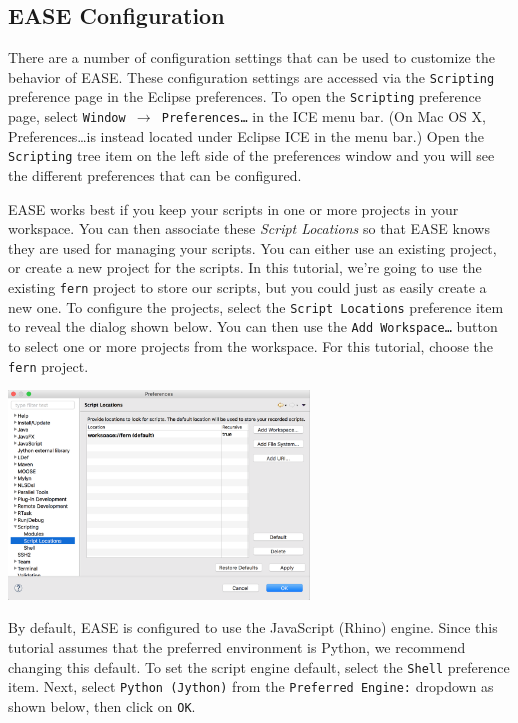 \subsection{EASE Configuration}

There are a number of configuration settings that can be used to customize the
behavior of EASE. These configuration settings are accessed via the \texttt{Scripting}
preference page in the Eclipse preferences. To open the \texttt{Scripting}
preference page, select \texttt{Window $\rightarrow$ Preferences\ldots} in the
ICE menu bar. (On Mac OS X, Preferences\ldots is instead located under Eclipse
ICE in the menu bar.) Open the \texttt{Scripting} tree item on the left side of
the preferences window and you will see the different preferences that can be
configured.

EASE works best if you keep your scripts in one or more projects in
your workspace. You can then associate these \emph{Script Locations} so
that EASE knows they are used for managing your scripts. You can either use an
existing project, or create a new project for the scripts. In this tutorial,
we're going to use the existing \texttt{fern} project to store our scripts, but
you could just as easily create a new one. To configure the projects, select the
\texttt{Script Locations} preference item to reveal the dialog shown below.
You can then use the \texttt{Add Workspace\ldots} button to
select one or more projects from the workspace. For this tutorial, choose the
\texttt{fern} project.

\begin{center} \includegraphics[width=8cm]{images/scripting-prefs1}
\end{center}

By default, EASE is configured to use the JavaScript (Rhino) engine.
Since this tutorial assumes that the preferred environment is Python, we recommend changing
this default. To set the script engine default, select the
\texttt{Shell} preference item. Next, select \texttt{Python (Jython)} from
the \texttt{Preferred Engine:} dropdown as shown below,
then click on \texttt{OK}.

